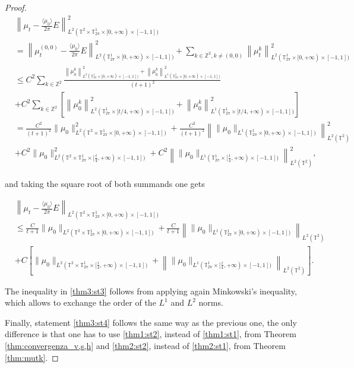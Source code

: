 \documentclass[a4paper,10pt,reqno]{amsart}
\numberwithin{equation}{subsection}
\numberwithin{figure}{subsection}
\begin{document}
\begin{proof}
{\small\begin{align*}
&\left\|\mu_t-\frac{\langle\mu_0\rangle}{2\pi}E\right\|_{L^2(\mathbb{T}^2\times\mathbb{T}^1_{2\pi}\times[0,+\infty)\times[-1,1])}^2
\\
&=\left\|\mu_t^{(0,0)}-\frac{\langle\mu_0\rangle}{2\pi}E\right\|_{L^2(\mathbb{T}^1_{2\pi}\times[0,+\infty)\times[-1,1])}^2+\sum_{k\in\mathbb{Z}^2,k\neq(0,0)}\left\|\mu_t^k\right\|_{L^2(\mathbb{T}^1_{2\pi}\times[0,+\infty)\times[-1,1])}^2
\\
&\leq C^2\sum_{k\in\mathbb{Z}^2}\frac{\left\|\mu_0^k\right\|_{L^2(\mathbb{T}^1_{2\pi}\times[0,+\infty)\times[-1,1])}^2+\left\|\mu_0^k\right\|_{L^1(\mathbb{T}^1_{2\pi}\times[0,+\infty)\times[-1,1])}^2}{(t+1)^2}
\\
&+C^2\sum_{k\in\mathbb{Z}^2}\left[\left\|\mu_0^k\right\|_{L^2(\mathbb{T}^1_{2\pi}\times[t/4,+\infty)\times[-1,1])}^2+\left\|\mu_0^k\right\|_{L^1(\mathbb{T}^1_{2\pi}\times[t/4,+\infty)\times[-1,1])}^2\right]
\\
&=\frac{C^2}{(t+1)^2}\|\mu_0\|_{L^2(\mathbb{T}^2\times\mathbb{T}^1_{2\pi}\times[0,+\infty)\times[-1,1])}^2+\frac{C^2}{(t+1)^2}\left\|\|\mu_0\|_{L^1(\mathbb{T}^1_{2\pi}\times[0,+\infty)\times[-1,1])}\right\|_{L^2(\mathbb{T}^2)}^2
\\
&+C^2\|\mu_0\|_{L^2(\mathbb{T}^2\times\mathbb{T}^1_{2\pi}\times[\frac{t}{4},+\infty)\times[-1,1])}^2+C^2\left\|\|\mu_0\|_{L^1(\mathbb{T}^1_{2\pi}\times[\frac{t}{4},+\infty)\times[-1,1])}\right\|_{L^2(\mathbb{T}^2)}^2,
\end{align*}}

and taking the square root of both summands one gets

\begin{align*}
&\left\|\mu_t-\frac{\langle\mu_0\rangle}{2\pi}E\right\|_{L^2(\mathbb{T}^2\times\mathbb{T}^1_{2\pi}\times[0,+\infty)\times[-1,1])}
\\
&\leq\frac{C}{t+1}\|\mu_0\|_{L^2(\mathbb{T}^2\times\mathbb{T}^1_{2\pi}\times[0,+\infty)\times[-1,1])}+\frac{C}{t+1}\left\|\|\mu_0\|_{L^1(\mathbb{T}^1_{2\pi}\times[0,+\infty)\times[-1,1])}\right\|_{L^2(\mathbb{T}^2)}
\\
&+C\left[\|\mu_0\|_{L^2(\mathbb{T}^2\times\mathbb{T}^1_{2\pi}\times[\frac{t}{4},+\infty)\times[-1,1])}+\left\|\|\mu_0\|_{L^1(\mathbb{T}^1_{2\pi}\times[\frac{t}{4},+\infty)\times[-1,1])}\right\|_{L^2(\mathbb{T}^2)}\right].
\end{align*}

The inequality in \eqref{thm3:st3} follows from applying again Minkowski's inequality, which allows to exchange the order of the $L^1$ and $L^2$ norms. 

Finally, statement \eqref{thm3:st4} follows the same way as the previous one, the only difference is that one has to use \eqref{thm1:st2}, instead of \eqref{thm1:st1}, from Theorem \ref{thm:convergenza_v,s,h} and \eqref{thm2:st2}, instead of \eqref{thm2:st1}, from Theorem \ref{thm:mutk}.\end{proof}
\end{document}
